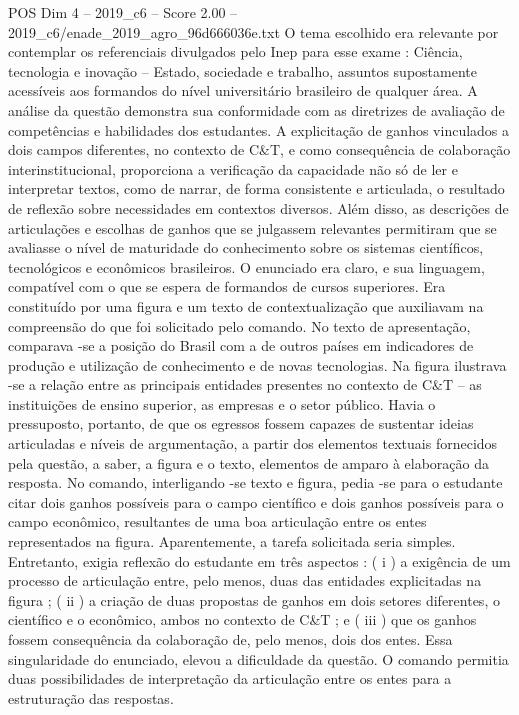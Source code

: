 \begin{textsample}{POS Dim 4 – 2019\_c6 – Score 2.00 – 2019\_c6/enade\_2019\_agro\_96d666036e.txt}
O tema escolhido era relevante por contemplar os referenciais divulgados pelo Inep para esse exame : Ciência, tecnologia e inovação – Estado, sociedade e trabalho, assuntos supostamente acessíveis aos formandos do nível universitário brasileiro de qualquer área.
A análise da questão demonstra sua conformidade com as diretrizes de avaliação de competências e habilidades dos estudantes.
A explicitação de ganhos vinculados a dois campos diferentes, no contexto de C\&T, e como consequência de colaboração interinstitucional, proporciona a verificação da capacidade não só de ler e interpretar textos, como de narrar, de forma consistente e articulada, o resultado de reflexão sobre necessidades em contextos diversos.
Além disso, as descrições de articulações e escolhas de ganhos que se julgassem relevantes permitiram que se avaliasse o nível de maturidade do conhecimento sobre os sistemas científicos, tecnológicos e econômicos brasileiros.
O enunciado era claro, e sua linguagem, compatível com o que se espera de formandos de cursos superiores.
Era constituído por uma figura e um texto de contextualização que auxiliavam na compreensão do que foi solicitado pelo comando.
No texto de apresentação, comparava -se a posição do Brasil com a de outros países em indicadores de produção e utilização de conhecimento e de novas tecnologias.
Na figura ilustrava -se a relação entre as principais entidades presentes no contexto de C\&T – as instituições de ensino superior, as empresas e o setor público.
Havia o pressuposto, portanto, de que os egressos fossem capazes de sustentar ideias articuladas e níveis de argumentação, a partir dos elementos textuais fornecidos pela questão, a saber, a figura e o texto, elementos de amparo à elaboração da resposta.
No comando, interligando -se texto e figura, pedia -se para o estudante citar dois ganhos possíveis para o campo científico e dois ganhos possíveis para o campo econômico, resultantes de uma boa articulação entre os entes representados na figura.
Aparentemente, a tarefa solicitada seria simples.
Entretanto, exigia reflexão do estudante em três aspectos : ( i ) a exigência de um processo de articulação entre, pelo menos, duas das entidades explicitadas na figura ; ( ii ) a criação de duas propostas de ganhos em dois setores diferentes, o científico e o econômico, ambos no contexto de C\&T ; e ( iii ) que os ganhos fossem consequência da colaboração de, pelo menos, dois dos entes.
Essa singularidade do enunciado, elevou a dificuldade da questão.
O comando permitia duas possibilidades de interpretação da articulação entre os entes para a estruturação das respostas.

\end{textsample}
